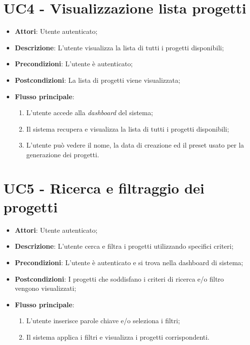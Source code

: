 \vspace{0.5cm}  
\section*{UC4 - Visualizzazione lista progetti}
\begin{itemize}
    \item \textbf{Attori}: Utente autenticato;
    \item \textbf{Descrizione}: L'utente visualizza la lista di tutti i progetti disponibili;
    \item \textbf{Precondizioni}: L'utente è autenticato;
    \item \textbf{Postcondizioni}: La lista di progetti viene visualizzata;
    \item \textbf{Flusso principale}:
    \begin{enumerate}
        \item L'utente accede alla \textit{dashboard} del sistema;
        \item Il sistema recupera e visualizza la lista di tutti i progetti disponibili;
        \item L'utente può vedere il nome, la data di creazione ed il preset usato per la generazione dei progetti.
    \end{enumerate}
\end{itemize}

\vspace{0.5cm}  
\section*{UC5 - Ricerca e filtraggio dei progetti}
\begin{itemize}
    \item \textbf{Attori}: Utente autenticato;
    \item \textbf{Descrizione}: L'utente cerca e filtra i progetti utilizzando specifici criteri;
    \item \textbf{Precondizioni}: L'utente è autenticato e si trova nella dashboard di sistema;
    \item \textbf{Postcondizioni}: I progetti che soddisfano i criteri di ricerca e/o filtro vengono visualizzati;
    \item \textbf{Flusso principale}:
    \begin{enumerate}
        \item L'utente inserisce parole chiave e/o seleziona i filtri;
        \item Il sistema applica i filtri e visualizza i progetti corrispondenti.
    \end{enumerate}
\end{itemize}

